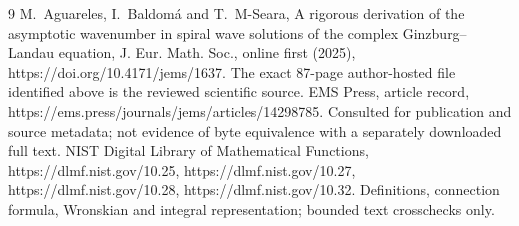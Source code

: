 \documentclass[10pt]{article}
\begin{document}
9 M. Aguareles, I. Baldomá and T. M-Seara, A rigorous derivation of the asymptotic wavenumber in spiral wave solutions of the complex Ginzburg–Landau equation, J. Eur. Math. Soc., online first (2025), https://doi.org/10.4171/jems/1637. The exact 87-page author-hosted file identified above is the reviewed scientific source. EMS Press, article record, https://ems.press/journals/jems/articles/14298785. Consulted for publication and source metadata; not evidence of byte equivalence with a separately downloaded full text. NIST Digital Library of Mathematical Functions, https://dlmf.nist.gov/10.25, https://dlmf.nist.gov/10.27, https://dlmf.nist.gov/10.28, https://dlmf.nist.gov/10.32. Definitions, connection formula, Wronskian and integral representation; bounded text crosschecks only.\par
\end{document}
